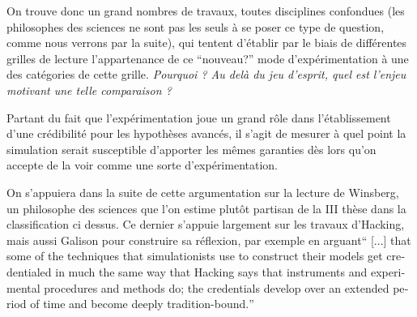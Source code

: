 
On trouve donc un grand nombres de travaux, toutes disciplines confondues (les philosophes des sciences ne sont pas les seuls à se poser ce type de question, comme nous verrons par la suite), qui tentent d'établir par le biais de différentes grilles de lecture l'appartenance de ce \enquote{nouveau?} mode d'expérimentation à une des catégories de cette grille. \textit{Pourquoi ? Au delà du jeu d'esprit, quel est l'enjeu motivant une telle comparaison ?}



Partant du fait que l'expérimentation joue un grand rôle dans l'établissement d'une crédibilité pour les hypothèses avancés, il s'agit de mesurer à quel point la simulation serait susceptible d'apporter les mêmes garanties dès lors qu'on accepte de la voir comme une sorte d'expérimentation.

On s'appuiera dans la suite de cette argumentation sur la lecture de Winsberg, un philosophe des sciences que l'on estime plutôt partisan de la III thèse dans la classification ci dessus. Ce dernier s'appuie largement sur les travaux d'Hacking, mais aussi Galison pour construire sa réflexion, par exemple en arguant\foreignquote{english}{ [...] that some of the techniques that simulationists use to construct their models get credentialed in much the same way that Hacking says that instruments and experimental procedures and methods do; the credentials develop over an extended period of time and become deeply tradition-bound.} \autocites{Winsberg2003, Winsberg2013} 

